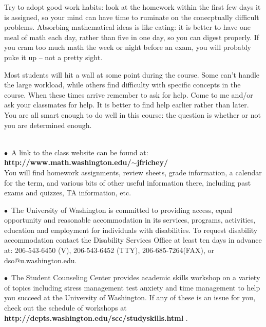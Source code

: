 \documentclass[11 pt]{report}
\begin{document}
\vspace{.2cm}

\noindent Try to adopt good work habits: look at
the homework within the first few days it is assigned, so your mind can have time to ruminate on the conecptually difficult problems.
Absorbing mathematical ideas is like eating: it is better to have one meal of math each day, rather than five in one day, so you can digest properly. If you cram too much math the week or night before an exam, you will probably puke it up -- not a pretty sight. 
\vspace{.25cm}  

 Most students will hit a wall at some point
during the course.  Some can't handle the large workload, while
others find difficulty with specific concepts in the course. When
these times arrive remember to ask for help.  Come to me and/or ask your classmates for help. It is better to find help earlier rather
than later. You are all smart enough to do well in this course: the
question is whether or not you are determined enough.
\vspace{0.3cm}

 \\
\noindent $\bullet$\ A link to the class website can be
found at: {\bf http://www.math.washington.edu/$\sim$jfrichey/} \\ You
will find homework assignments, review sheets, grade information, a
calendar for the term, and various bits of other useful information
there, including past exams and quizzes, TA information, etc.

\vspace{.2cm}

\noindent $\bullet$\ The University of Washington is committed to providing
access, equal opportunity and reasonable accommodation in its
services, programs, activities, education and employment for
individuals with disabilities.  To request disability accommodation
contact the Disability Services Office at least ten days in advance
at: 206-543-6450 (V), 206-543-6452 (TTY), 206-685-7264(FAX), or
dso@u.washington.edu.

\vspace{.2cm}

\noindent $\bullet$\  The Student Counseling Center provides academic skills
workshop on a variety of topics including stress management test
anxiety and time management to help you succeed at the University of
Washington. If any of these is an issue for you, check out the
schedule of workshops at {\bf
http://depts.washington.edu/scc/studyskills.html} .
\end{document}
